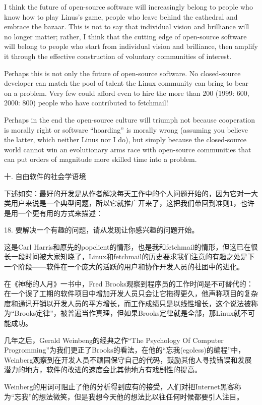 \documentclass[a4paper,12pt,UTF8,twoside]{ctexbook}
\begin{document}
I think the future of open-source software will increasingly belong to people who know how to play Linus's game, people who leave behind the cathedral and embrace the bazaar. This is not to say that individual vision and brilliance will no longer matter; rather, I think that the cutting edge of open-source software will belong to people who start from individual vision and brilliance, then amplify it through the effective construction of voluntary communities of interest.

Perhaps this is not only the future of open-source software. No closed-source developer can match the pool of talent the Linux community can bring to bear on a problem. Very few could afford even to hire the more than 200 (1999: 600, 2000: 800) people who have contributed to fetchmail!

Perhaps in the end the open-source culture will triumph not because cooperation is morally right or software ``hoarding'' is morally wrong (assuming you believe the latter, which neither Linus nor I do), but simply because the closed-source world cannot win an evolutionary arms race with open-source communities that can put orders of magnitude more skilled time into a problem.

十. 自由软件的社会学语境


下述如实：最好的开发是从作者解决每天工作中的个人问题开始的，因为它对一大类用户来说是一个典型问题，所以它就推广开来了，这把我们带回到准则1，也许是用一个更有用的方式来描述：


18. 要解决一个有趣的问题，请从发现让你感兴趣的问题开始。


这是Carl Harris和原先的popclient的情形，也是我和fetchmail的情形，但这已在很长一段时间被大家知晓了，Linux和fetchmail的历史要求我们注意的有趣之处是下一个阶段——软件在一个庞大的活跃的用户和协作开发人员的社团中的进化。


在《神秘的人月》一书中，Fred Brooks观察到程序员的工作时间是不可替代的：在一个误了工期的软件项目中增加开发人员只会让它拖得更久，他声称项目的复杂度和通讯开销以开发人员的平方增长，而工作成绩只是以线性增长，这个说法被称为“Brooks定律”，被普遍当作真理，但如果Brooks定律就是全部，那Linux就不可能成功。


几年之后，Gerald Weinbeng的经典之作“The Psychology Of Computer Progromming”为我们更正了Brooks的看法，在他的“忘我(egoless)的编程”中，Weinberg观察到在开发人员不顽固保守自己的代码，鼓励其他人寻找错误和发展潜力的地方，软件的改进的速度会比其他地方有戏剧性的提高。


Weinberg的用词可阻止了他的分析得到应有的接受，人们对把Internet黑客称为“忘我”的想法微笑，但是我想今天他的想法比以往任何时候都要引人注目。
\end{document}
